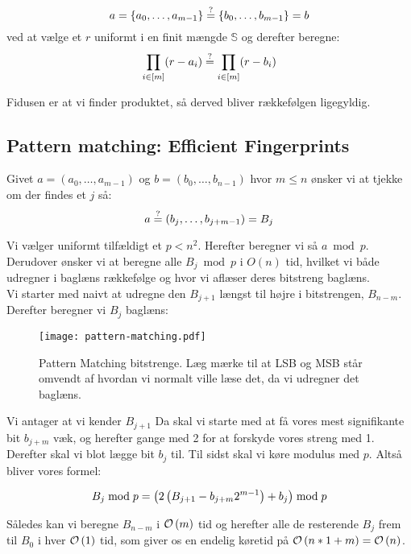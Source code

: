 $$
  a = \{a_0, \dots, a_{m-1} \}
  \stackrel{?}{=}
  \{b_0, \dots, b_{m-1} \} = b
$$
ved at vælge et $r$ uniformt i en finit mængde $\mathbb S$ og derefter beregne:
$$
  \prod_{i \in [m]} (r - a_i) \stackrel{?}{=}
  \prod_{i \in [m]} (r - b_i)
$$

Fidusen er at vi finder produktet, så derved bliver rækkefølgen ligegyldig.






\subsection{Pattern matching: Efficient Fingerprints}
Givet $a = (a_0, \dots, a_{m-1})$ og $b = (b_0, \dots, b_{n-1})$ hvor $m \leq n$ ønsker vi at tjekke om der findes et $j$ så:
$$
  a \stackrel{?}{=} (b_j, \dots, b_{j+m-1}) = B_j
$$

Vi vælger uniformt tilfældigt et $p < n^2$. Herefter beregner vi så $a \bmod p$. Derudover ønsker vi at beregne alle $B_j \bmod p$ i $O(n)$ tid, hvilket vi både udregner i baglæns rækkefølge og hvor vi aflæser deres bitstreng baglæns.\\

Vi starter med naivt at udregne den $B_{j+1}$ længst til højre i bitstrengen, $B_{n-m}$. Derefter beregner vi $B_j$ baglæns:

\begin{figure}[H]
  \begin{center}
  \texttt{[image: pattern-matching.pdf]}
  \end{center}
  \caption{Pattern Matching bitstrenge. Læg mærke til at LSB og MSB står omvendt af hvordan vi normalt ville læse det, da vi udregner det baglæns.}
  \label{fig:pattern}
\end{figure}

Vi antager at vi kender $B_{j+1}$ Da skal vi starte med at få vores mest signifikante bit $b_{j+m}$ væk, og herefter gange med 2 for at forskyde vores streng med 1. Derefter skal vi blot lægge bit $b_j$ til. Til sidst skal vi køre modulus med $p$. Altså bliver vores formel:

$$
  B_{j} \bmod p
  = \left( 2 \left(  B_{j+1} - b_{j+m} 2^{m-1}  \right) + b_j \right) \bmod p
$$

Således kan vi beregne $B_{n-m}$ i $\mathcal{O} \left(  m  \right)$ tid og herefter alle de resterende $B_j$ frem til $B_0$ i hver $\mathcal{O} \left(  1  \right)$ tid, som giver os en endelig køretid på $\mathcal{O} \left(  n*1 + m  \right) = \mathcal{O} \left(  n  \right)$.









